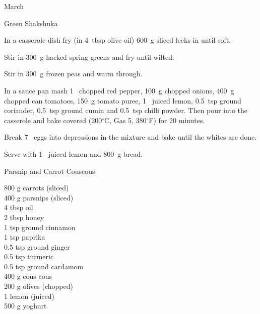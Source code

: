\begin{menu}{March}
\begin{recipe}{2}{Green Shakshuka}
    \begin{instructions}
    \item 
        In a casserole dish fry
        (in 4~tbsp  olive oil)
        600~g sliced leeks
        in until soft.
      \item 
        Stir in 300~g hacked spring greens
        and fry until wilted.
      \item 
        Stir in 300~g  frozen peas
        and warm through.
      \item 
        In a sauce pan mash
        1~ chopped red pepper,
        100~g chopped onions,
        400~g chopped can tomatoes,
        150~g  tomato puree,
        1~ juiced lemon,
        0.5~tsp  ground coriander,
        0.5~tsp  ground cumin
        and 
        0.5~tsp  chilli powder.
        Then pour into the casserole
        and bake covered (200$^{\circ}$C, Gas 5, 380$^{\circ}$F) for 20 minutes.      
      \item 
        Break 7~  eggs into depressions in the mixture
        and bake until the whites are done. 
      \item 
        Serve with 
        1~ juiced lemon 
        and
        800~g  bread.
      
    \end{instructions}
    \end{recipe}%
  
    \begin{recipe}{2}{Parsnip and Carrot Couscous}%
		\begin{ingredients}
		800 g carrots (sliced) \\
	400 g parsnips (sliced) \\
	4 tbsp oil  \\
	2 tbsp honey  \\
	1 tsp ground cinnamon  \\
	1 tsp paprika  \\
	0.5 tsp ground ginger  \\
	0.5 tsp turmeric  \\
	0.5 tsp ground cardamom  \\
	400 g cous cous  \\
	200 g olives (chopped) \\
	1  lemon (juiced) \\
	500 g yoghurt  \\
	
		\end{ingredients}
	

\end{recipe}
\end{menu}
